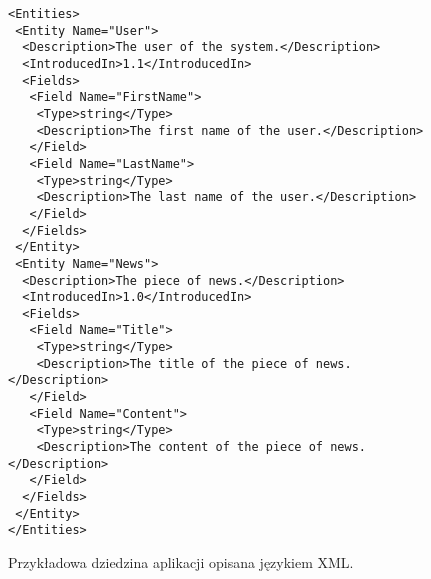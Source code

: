\begin{figure}[!ht]
\begin{verbatim}
<Entities>
 <Entity Name="User">
  <Description>The user of the system.</Description>
  <IntroducedIn>1.1</IntroducedIn>
  <Fields>
   <Field Name="FirstName">
    <Type>string</Type>
    <Description>The first name of the user.</Description>
   </Field>
   <Field Name="LastName">
    <Type>string</Type>
    <Description>The last name of the user.</Description>
   </Field>
  </Fields>
 </Entity>
 <Entity Name="News">
  <Description>The piece of news.</Description>
  <IntroducedIn>1.0</IntroducedIn>
  <Fields>
   <Field Name="Title">
    <Type>string</Type>
    <Description>The title of the piece of news.</Description>
   </Field>
   <Field Name="Content">
    <Type>string</Type>
    <Description>The content of the piece of news.</Description>
   </Field>
  </Fields>
 </Entity>
</Entities>
\end{verbatim}

\caption{Przykładowa dziedzina aplikacji opisana językiem XML.}
\label{fig:implementation_core:xml}
\end{figure}
